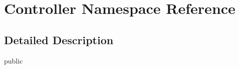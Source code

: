 \hypertarget{namespace_controller}{}\section{Controller Namespace Reference}
\label{namespace_controller}


\subsection{Detailed Description}
public 